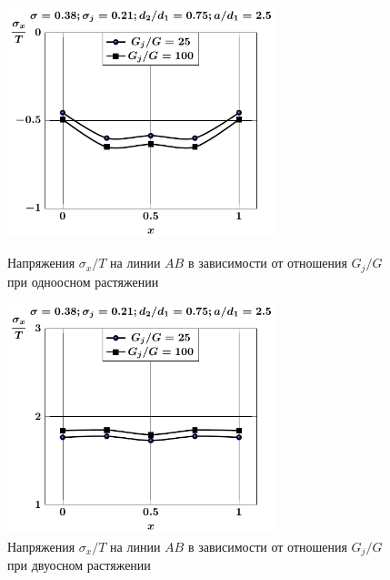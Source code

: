 \begin{figure}[h!]
\centering\footnotesize
\parbox[b]{7.5cm}{\centering\includegraphics[width=7.8cm]{inc4-g-a25-d75-t1-sig_x.pdf}
\caption{Напряжения $\sigma_x/T$ на линии $AB$ в зависимости от отношения $G_j/G$ при одноосном растяжении
\label{f:9:67}}}\hfil\hfil
\parbox[b]{7.5cm}{\centering\includegraphics[width=7.8cm]{inc4-g-a25-d75-t2-sig_x.pdf}
\caption{Напряжения $\sigma_x/T$ на линии $AB$ в зависимости от отношения $G_j/G$ при двуосном растяжении
\label{f:9:68}}}
\end{figure}

